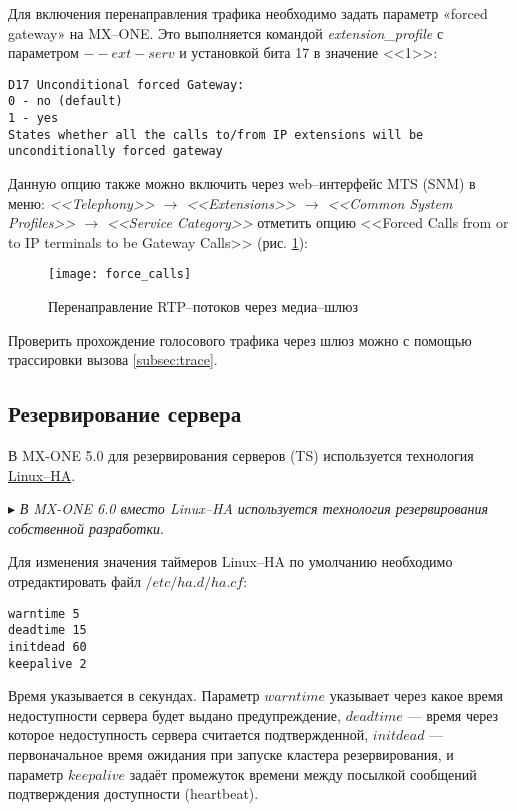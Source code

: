 Для включения перенаправления трафика необходимо задать параметр «forced gateway» на MX--ONE. Это выполняется командой {\em extension\_profile} с параметром $--ext-serv$ и установкой бита 17 в значение <<1>>:
\begin{lstlisting}
D17 Unconditional forced Gateway: 
0 - no (default)
1 - yes
States whether all the calls to/from IP extensions will be unconditionally forced gateway
\end{lstlisting}

Данную опцию также можно включить через web--интерфейс MTS (SNM) в меню: {\em <<Telephony>> $\rightarrow$ <<Extensions>> $\rightarrow$ <<Common System Profiles>> $\rightarrow$ <<Service Category>>} отметить опцию <<Forced Calls from or to IP terminals to be Gateway Calls>> (рис. \ref{img:force_calls}):
\begin{figure}[!ht]
  \center
  \texttt{[image: force\_calls]}
  \caption{Перенаправление RTP--потоков через медиа--шлюз}
  \label{img:force_calls}
\end{figure}

Проверить прохождение голосового трафика через шлюз можно с помощью трассировки вызова \ref{subsec:trace}.

\subsection{Резервирование сервера}

В MX-ONE 5.0 для резервирования серверов (TS) используется технология \href{http://www.linux-ha.org/doc/users-guide/users-guide.html}{Linux--HA}.

$\blacktriangleright$ {\em В MX-ONE 6.0 вместо Linux--HA используется технология резервирования собственной разработки}.

Для изменения значения таймеров Linux--HA по умолчанию необходимо отредактировать файл $/etc/ha.d/ha.cf$:
\begin{lstlisting}
warntime 5
deadtime 15
initdead 60
keepalive 2
\end{lstlisting}

Время указывается в секундах. Параметр $warntime$ указывает через какое время недоступности сервера будет выдано предупреждение, $deadtime$ --- время через которое недоступность сервера считается подтвержденной, $initdead$ --- первоначальное время ожидания при запуске кластера резервирования, и параметр $keepalive$ задаёт промежуток времени между посылкой сообщений подтверждения доступности (heartbeat).  

